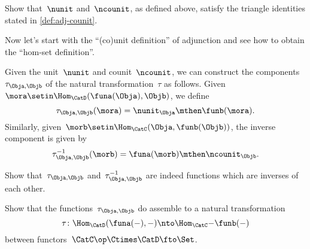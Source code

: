 \begin{solution}
    \missingsolution
\end{solution}

\begin{exercise}
    \label{ex:eta-epsilon-triangle}
    Show that~$\nunit$ and~$\ncounit$, as defined above, satisfy the triangle identities stated in \cref{def:adj-counit}.
\end{exercise}

\begin{solution}
    \missingsolution
\end{solution}

Now let's start with the ``(co)unit definition'' of adjunction and see how to obtain the ``hom-set definition''.

Given the unit~$\nunit$ and counit~$\ncounit$, we can construct the components~$\tau_{\Obja,\Objb}$ of the natural transformation~$\tau$ as follows.
Given~$\mora \setin \Hom_{\CatD}(\funa(\Obja),\Objb)$, we define
\begin{equation}
    \tau_{\Obja,\Objb}(\mora) = \nunit_\Obja \mthen \funb(\mora).
\end{equation}
Similarly, given~$\morb \setin \Hom_{\CatC}(\Obja,\funb(\Objb))$, the inverse component is given by
\begin{equation}
    \tau_{\Obja,\Objb}^{-1}(\morb) = \funa(\morb) \mthen \ncounit_\Objb.
\end{equation}

\begin{exercise}
    \label{ex:tau}
    Show that~$\tau_{\Obja,\Objb}$ and~$\tau_{\Obja,\Objb}^{-1}$ are indeed functions which are inverses of each other.
\end{exercise}

\begin{solution}
    \missingsolution
\end{solution}

\begin{exercise}
    \label{ex:tau2}
    Show that the functions~$\tau_{\Obja,\Objb}$ do assemble to a natural transformation
    \begin{equation}
        \tau  \colon \Hom_{\CatD}(\funa(-) ,- ) \nto \Hom_{\CatC}{-}{\funb(-)}
    \end{equation}
    between functors~$\CatC\op \Ctimes \CatD \fto \Set $.
\end{exercise}

\begin{solution}
    \missingsolution
\end{solution}
